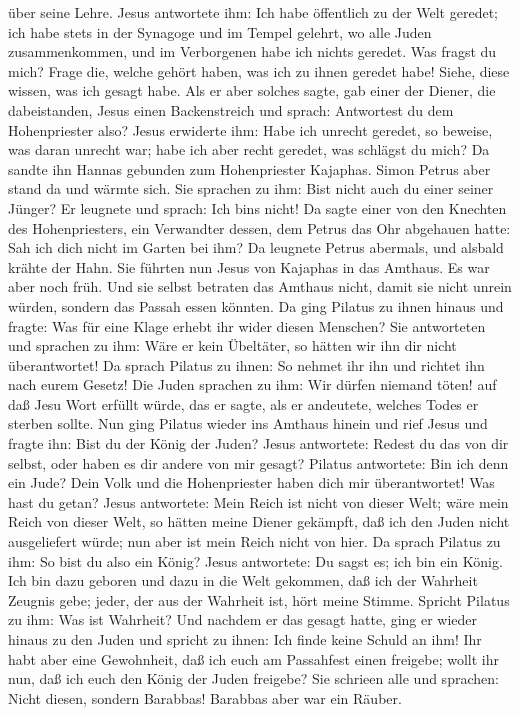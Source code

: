 über seine Lehre.  Jesus antwortete ihm: Ich habe
öffentlich zu der Welt geredet; ich habe stets in der Synagoge und im
Tempel gelehrt, wo alle Juden zusammenkommen, und im Verborgenen habe
ich nichts geredet.  Was fragst du mich? Frage die,
welche gehört haben, was ich zu ihnen geredet habe! Siehe, diese wissen,
was ich gesagt habe.  Als er aber solches sagte, gab
einer der Diener, die dabeistanden, Jesus einen Backenstreich und
sprach: Antwortest du dem Hohenpriester also?  Jesus
erwiderte ihm: Habe ich unrecht geredet, so beweise, was daran unrecht
war; habe ich aber recht geredet, was schlägst du mich? 
Da sandte ihn Hannas gebunden zum Hohenpriester Kajaphas.
 Simon Petrus aber stand da und wärmte sich. Sie sprachen
zu ihm: Bist nicht auch du einer seiner Jünger? Er leugnete und sprach:
Ich bin\textquotesingle s nicht!  Da sagte einer von den
Knechten des Hohenpriesters, ein Verwandter dessen, dem Petrus das Ohr
abgehauen hatte: Sah ich dich nicht im Garten bei ihm? 
Da leugnete Petrus abermals, und alsbald krähte der Hahn.
 Sie führten nun Jesus von Kajaphas in das Amthaus. Es
war aber noch früh. Und sie selbst betraten das Amthaus nicht, damit sie
nicht unrein würden, sondern das Passah essen könnten. 
Da ging Pilatus zu ihnen hinaus und fragte: Was für eine Klage erhebt
ihr wider diesen Menschen?  Sie antworteten und sprachen
zu ihm: Wäre er kein Übeltäter, so hätten wir ihn dir nicht
überantwortet!  Da sprach Pilatus zu ihnen: So nehmet ihr
ihn und richtet ihn nach eurem Gesetz! Die Juden sprachen zu ihm: Wir
dürfen niemand töten!  auf daß Jesu Wort erfüllt würde,
das er sagte, als er andeutete, welches Todes er sterben sollte.
 Nun ging Pilatus wieder ins Amthaus hinein und rief
Jesus und fragte ihn: Bist du der König der Juden?  Jesus
antwortete: Redest du das von dir selbst, oder haben es dir andere von
mir gesagt?  Pilatus antwortete: Bin ich denn ein Jude?
Dein Volk und die Hohenpriester haben dich mir überantwortet! Was hast
du getan?  Jesus antwortete: Mein Reich ist nicht von
dieser Welt; wäre mein Reich von dieser Welt, so hätten meine Diener
gekämpft, daß ich den Juden nicht ausgeliefert würde; nun aber ist mein
Reich nicht von hier.  Da sprach Pilatus zu ihm: So bist
du also ein König? Jesus antwortete: Du sagst es; ich bin ein König. Ich
bin dazu geboren und dazu in die Welt gekommen, daß ich der Wahrheit
Zeugnis gebe; jeder, der aus der Wahrheit ist, hört meine Stimme.
 Spricht Pilatus zu ihm: Was ist Wahrheit? Und nachdem er
das gesagt hatte, ging er wieder hinaus zu den Juden und spricht zu
ihnen: Ich finde keine Schuld an ihm!  Ihr habt aber eine
Gewohnheit, daß ich euch am Passahfest einen freigebe; wollt ihr nun,
daß ich euch den König der Juden freigebe?  Sie schrieen
alle und sprachen: Nicht diesen, sondern Barabbas! Barabbas aber war ein
Räuber.

